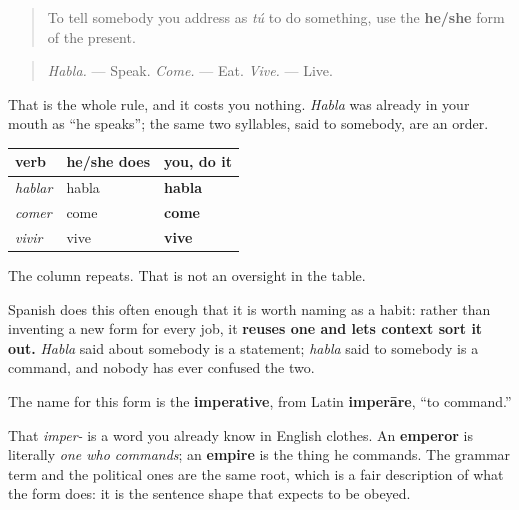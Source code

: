 \begin{grammarlens}[title={Grammar Lens: you already have it}]
\begin{quote}
To tell somebody you address as \emph{tú} to do something, use the \textbf{he/she} form of the present.
\end{quote}

\begin{quote}
\emph{Habla.} — Speak. \emph{Come.} — Eat. \emph{Vive.} — Live.
\end{quote}

That is the whole rule, and it costs you nothing. \emph{Habla} was already in your mouth as \textquotedblleft{}he speaks\textquotedblright{}; the same two syllables, said to somebody, are an order.

\noindent
\begin{tabularx}{\linewidth}{@{}>{\raggedright\arraybackslash}X>{\raggedright\arraybackslash}X>{\raggedright\arraybackslash}X@{}}
\toprule
\textbf{verb} & \textbf{he/she does} & \textbf{you, do it} \\
\midrule
\emph{hablar} & habla & \textbf{habla} \\
\emph{comer} & come & \textbf{come} \\
\emph{vivir} & vive & \textbf{vive} \\
\bottomrule
\end{tabularx}

The column repeats. That is not an oversight in the table.

Spanish does this often enough that it is worth naming as a habit: rather than inventing a new form for every job, it \textbf{reuses one and lets context sort it out.} \emph{Habla} said about somebody is a statement; \emph{habla} said to somebody is a command, and nobody has ever confused the two.
\end{grammarlens}

\begin{cousinweb}
The name for this form is the \textbf{imperative}, from Latin \textbf{imperāre}, \textquotedblleft{}to command.\textquotedblright{}

That \emph{imper-} is a word you already know in English clothes. An \textbf{emperor} is literally \emph{one who commands}; an \textbf{empire} is the thing he commands. The grammar term and the political ones are the same root, which is a fair description of what the form does: it is the sentence shape that expects to be obeyed.
\end{cousinweb}

